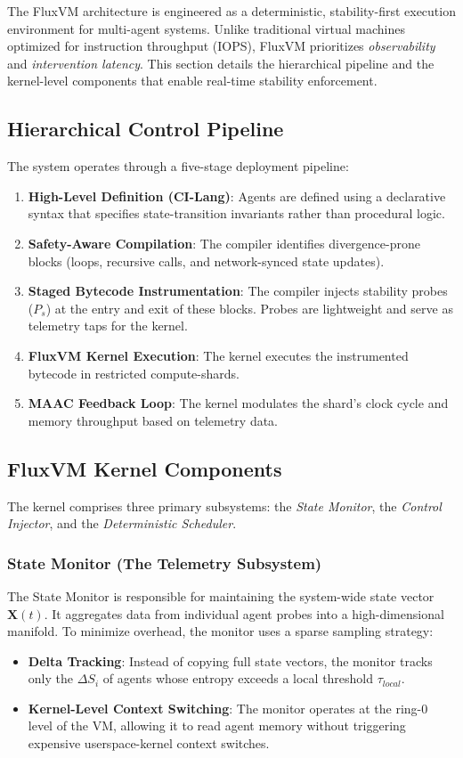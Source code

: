 \documentclass{article}
\begin{document}
The FluxVM architecture is engineered as a deterministic, stability-first execution environment for multi-agent systems. Unlike traditional virtual machines optimized for instruction throughput (IOPS), FluxVM prioritizes \textit{observability} and \textit{intervention latency}. This section details the hierarchical pipeline and the kernel-level components that enable real-time stability enforcement.

\subsection{Hierarchical Control Pipeline}
The system operates through a five-stage deployment pipeline:
\begin{enumerate}
    \item \textbf{High-Level Definition (CI-Lang)}: Agents are defined using a declarative syntax that specifies state-transition invariants rather than procedural logic.
    \item \textbf{Safety-Aware Compilation}: The compiler identifies divergence-prone blocks (loops, recursive calls, and network-synced state updates).
    \item \textbf{Staged Bytecode Instrumentation}: The compiler injects stability probes ($P_s$) at the entry and exit of these blocks. Probes are lightweight and serve as telemetry taps for the kernel.
    \item \textbf{FluxVM Kernel Execution}: The kernel executes the instrumented bytecode in restricted compute-shards.
    \item \textbf{MAAC Feedback Loop}: The kernel modulates the shard's clock cycle and memory throughput based on telemetry data.
\end{enumerate}

\subsection{FluxVM Kernel Components}
The kernel comprises three primary subsystems: the \textit{State Monitor}, the \textit{Control Injector}, and the \textit{Deterministic Scheduler}.

\subsubsection{State Monitor (The Telemetry Subsystem)}
The State Monitor is responsible for maintaining the system-wide state vector $\mathbf{X}(t)$. It aggregates data from individual agent probes into a high-dimensional manifold. 
To minimize overhead, the monitor uses a sparse sampling strategy:
\begin{itemize}
    \item \textbf{Delta Tracking}: Instead of copying full state vectors, the monitor tracks only the $\Delta S_i$ of agents whose entropy exceeds a local threshold $\tau_{local}$.
    \item \textbf{Kernel-Level Context Switching}: The monitor operates at the ring-0 level of the VM, allowing it to read agent memory without triggering expensive userspace-kernel context switches.
\end{itemize}
\end{document}
